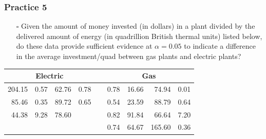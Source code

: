 \documentclass[handout]{beamer}
\begin{document}
\begin{frame}
    \frametitle{Practice 5}
    \begin{itemize}[wide = 0pt]
        \item[$\square$] Given the amount of money invested (in dollars) in a plant divided by the delivered amount of energy (in quadrillion British thermal units) listed below, do these data provide sufficient evidence at $\alpha=0.05$ to indicate a difference in the average investment/quad between gas plants and electric plants?
    \end{itemize} 
    \vspace{8pt}
    \centering
    \begin{tabular}{r r r r c r r r r}
    \toprule
        \multicolumn{4}{c}{\textbf{Electric}} & & \multicolumn{4}{c}{\textbf{Gas}} \\
    \midrule
        \small{204.15} & \small{0.57} & \small{62.76} & \small{0.78} & $\ $ & \small{0.78} & \small{16.66} & \small{74.94} & \small{0.01} \\
        
        \small{85.46} & \small{0.35} & \small{89.72} & \small{0.65} & $\ $ & \small{0.54} & \small{23.59} & \small{88.79} & \small{0.64} \\
        
        \small{44.38} & \small{9.28} & \small{78.60} & & $\ $ & \small{0.82} & \small{91.84} & \small{66.64} & \small{7.20} \\

         & & & & $\ $ & \small{0.74} & \small{64.67} & \small{165.60} & \small{0.36} \\
    \bottomrule
    \end{tabular}
    \vspace*{\fill}
\end{frame}
\end{document}
